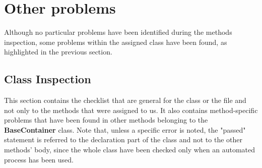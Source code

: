 \documentclass[11pt, a4paper,titlepage]{article}
\begin{document}
\section{Other problems}
Although no particular problems have been identified during the methods inspection, some problems within the assigned class have been found, as highlighted in the previous section.

\subsection{Class Inspection}
This section contains the checklist that are general for the class or the file and not only to the methods that were assigned to us. It also contains method-specific problems that have been found in other methods belonging to the \textbf{BaseContainer} class. \newline
Note that, unless a specific error is noted, the "passed" statement is referred to the declaration part of the class and not to the other methods' body, since the whole class have been checked only when an automated process has been used. 
\end{document}
